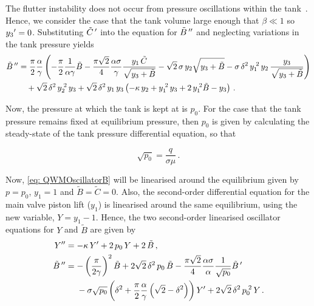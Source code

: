 The flutter instability does not occur from pressure oscillations within the tank~\cite{Allison2015TestingValves}. Hence, we consider the case that the tank volume large enough that $\beta \ll 1$ so $y_3{'} = 0$. Substituting $\tilde{C}\,{'}$ into the equation for $\tilde{B}\,{''}$ and neglecting variations in the tank pressure yields
~
\begin{equation} \label{eq: QWMOscillatorB}
\begin{split}
    \ddash{\tilde{B}\,} &= \frac{\pi}{2} \frac{\alpha}{\gamma} \left( - \frac{\pi}{2} \frac{1}{\alpha \gamma} \tilde{B} - \frac{\pi \sqrt{2}}{4} \frac{\alpha \sigma}{\gamma} \frac{y_1 \, \tilde{C}}{\sqrt{y_3 + \tilde{B}}} - \sqrt{2} \, \sigma \, y_2 \sqrt{y_3 + \tilde{B}} - \sigma \, \delta^2 \, y_1\power{2} \, y_2 \, \frac{y_3}{\sqrt{y_3 + \tilde{B}}} \right)
    \\ & \quad %
    + \sqrt{2} \, \delta^2 \, y_2\power{2} \, y_3
    + \sqrt{2} \, \delta^2 \, y_1 \, y_3 \left( - \kappa \, y_2 + y_1\power{2} \, y_3 + 2 \, y_1 \power{2} \tilde{B} - y_3 \right) \, .
\end{split}
\end{equation}

Now, the pressure at which the tank is kept at is $p_0$. For the case that the tank pressure remains fixed at equilibrium pressure, then $p_0$ is given by calculating the steady-state of the tank pressure differential equation, so that

\begin{equation*}
    \sqrt{p_0} = \frac{q}{\sigma \mu} \, .
\end{equation*}

\newpage
Now, \cref{eq: QWMOscillatorB} will be linearised around the equilibrium given by $p = p_0$, $y_1 = 1$ and $\tilde{B} = \tilde{C} = 0$. Also, the second-order differential equation for the main valve piston lift ($y_1$) is linearised around the same equilibrium, using the new variable, $Y = y_1 - 1$. Hence, the two second-order linearised oscillator equations for $Y$ and $\tilde{B}$ are given by
~
\begin{equation} \label{eq: YandBOscil}
\begin{split}
    \ddash{Y} &= - \kappa \, \dash{Y} + 2 \, p_0 \, Y + 2 \, \tilde{B} \, , \\
    \ddash{\tilde{B}\,} &= - \left( \frac{\pi}{2 \gamma} \right)^2 \tilde{B} + 2 \sqrt{2} \, \delta^2 \, p_0 \, \tilde{B} - \frac{\pi \sqrt{2}}{4} \frac{\alpha \sigma}{\alpha} \frac{1}{\sqrt{p_0}} \dash{\tilde{B}\,}
    \\ & \quad \, \, %
    - \sigma \sqrt{p_0} \left( \delta^2 + \frac{\pi}{2} \frac{\alpha}{\gamma} \left( \sqrt{2} - \delta^2 \right) \right) \dash{Y} + 2 \sqrt{2} \, \delta^2 \, p_0\power{2} \, Y \, .
\end{split}
\end{equation}

